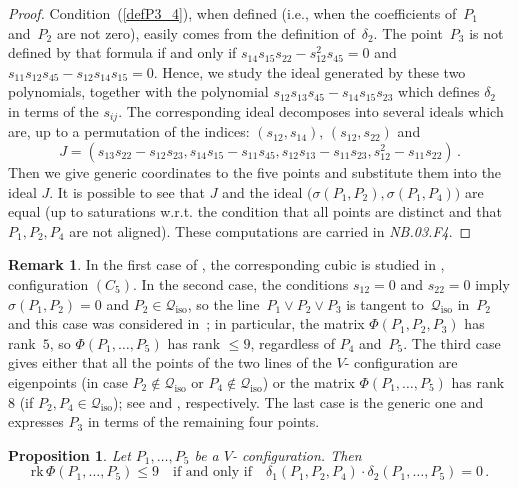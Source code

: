 \documentclass[a4paper, 11pt, reqno]{amsart}
\theoremstyle{plain}
\newtheorem{prop}[lemma]{Proposition}
\theoremstyle{definition}
\newtheorem{rmk}[lemma]{Remark}
\newcommand{\nb}[2]{\textsl{{NB}.{#1}.{#2}}}
\newcommand{\rk}{\ensuremath{\mathrm{rk}}}
\newcommand{\iso}{\mathcal{Q}_{\mathrm{iso}}}
\begin{document}
\begin{proof}
Condition~(\ref{defP3_4}), when defined (i.e., when the coefficients of~$P_1$ and~$P_2$ are not zero), easily comes from the definition of~$\delta_2$.
The point~$P_3$ is not defined by that formula if and only if
$s_{14}s_{15}s_{22}-s_{12}^2s_{45}=0$ and $s_{11}s_{12}s_{45}-s_{12}s_{14}s_{15}=0$.
Hence, we study the ideal generated by these two polynomials, together with the
polynomial $s_{12}s_{13}s_{45}-s_{14}s_{15} s_{23}$ which defines
$\delta_2$ in terms of the $s_{ij}$. The corresponding
ideal decomposes into several ideals which are, up to a permutation of
the indices: $(s_{12}, s_{14})$, $(s_{12}, s_{22})$ and
%
\[
  J = (s_{13}s_{22} - s_{12}s_{23}, s_{14}s_{15} - s_{11}s_{45}, s_{12}s_{13} -
  s_{11}s_{23}, s_{12}^2 - s_{11}s_{22}) \,.
\]
%
Then we give generic coordinates to the five
points and substitute them into the ideal $J$. It is possible to see that
$J$ and the ideal $\bigl(\sigma(P_1, P_2), \sigma(P_1, P_4)\bigr)$ are equal (up to
saturations w.r.t. the condition that all points are distinct and that $P_1, P_2, P_4$ are not aligned).
These computations are carried in \nb{03}{F4}.
\end{proof}
%
\begin{rmk}
In the first case of , the corresponding cubic
is studied in , configuration $(C_5)$.
In the second case, the conditions $s_{12}=0$ and $s_{22}=0$ imply $\sigma(P_1, P_2) = 0$ and $P_2\in \iso$, so the line~$P_1 \vee P_2 \vee P_3$ is tangent to~$\iso$ in~$P_2$
and this case was considered in~; in particular,
the matrix $\Phi(P_1, P_2, P_3)$ has rank~$5$, so
$\Phi(P_1, \dots, P_5)$ has rank $\le 9$, regardless of
$P_4$ and~$P_5$.
The third case gives either that all the
points of the two lines of the $V$- configuration are eigenpoints (in case
$P_2 \not\in \iso$ or $P_4 \not\in \iso$) or the matrix $\Phi(P_1, \dots, P_5)$
has rank~$8$ (if $P_2, P_4 \in \iso$); see  and , respectively.
The last case is the generic one and expresses $P_3$ in terms of the remaining four points.
\end{rmk}
%
\begin{prop}
\label{prop:d1d2}
Let $P_1, \dots, P_5$ be a $V$- configuration. Then
%
\[
  \rk \,\Phi(P_1, \dots, P_5) \leq 9
  \quad \mbox{if and only if} \quad
  \delta_1(P_1, P_2, P_4) \cdot \delta_2(P_1, \dots, P_5) = 0 \,.
\]
%
\end{prop}
\end{document}
